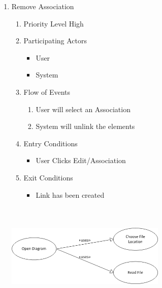 \documentclass[a4paper, 12pt]{article}
\begin{document}
\begin{enumerate}
\item Remove Association
  \begin {enumerate}
  \item Priority Level High
  \item Participating Actors
    \begin {itemize}
    \item User
    \item System
    \end {itemize}
  \item Flow of Events
    \begin {enumerate}
    \item User will select an Association
    \item System will unlink the elements
    \end {enumerate}
  \item Entry Conditions
    \begin {itemize}
    \item User Clicks Edit/Association
    \end {itemize}
  \item Exit Conditions
    \begin {itemize}
    \item Link has been created
    \end {itemize}
  \end {enumerate}

  \begin{center}
    \includegraphics[height=2in, width=3in]{img/OpenDiagram.png}
  \end{center}


\end{enumerate}
\end{document}
